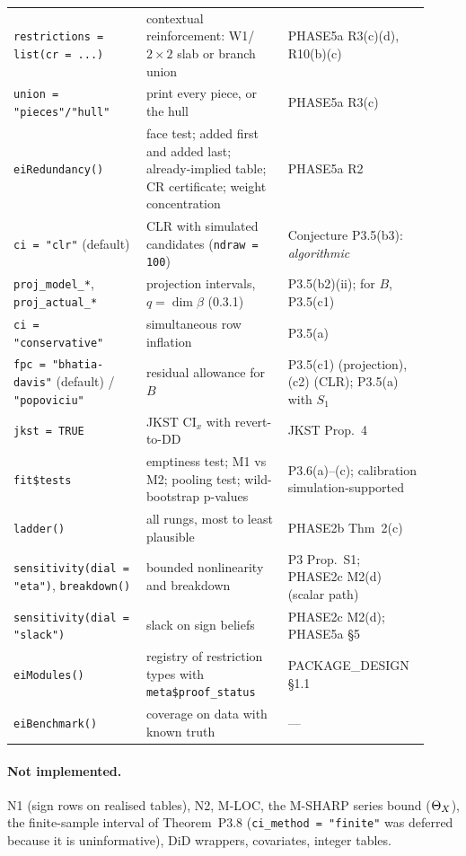 \begin{longtable}{@{}L{0.30\linewidth}L{0.32\linewidth}L{0.30\linewidth}@{}}
\texttt{restrictions = list(cr = ...)} & contextual reinforcement: W1/$2\times2$ slab or branch union & PHASE5a R3(c)(d), R10(b)(c) \\
\texttt{union = "pieces"/"hull"} & print every piece, or the hull & PHASE5a R3(c) \\
\texttt{eiRedundancy()} & face test; added first and added last; already-implied table; CR certificate; weight concentration & PHASE5a R2 \\
\texttt{ci = "clr"} (default) & CLR with simulated candidates (\texttt{ndraw = 100}) & Conjecture P3.5(b3): \emph{algorithmic} \\
\texttt{proj\_model\_*}, \texttt{proj\_actual\_*} & projection intervals, $q=\dim\beta$ (0.3.1) & P3.5(b2)(ii); for $B$, P3.5(c1) \\
\texttt{ci = "conservative"} & simultaneous row inflation & P3.5(a) \\
\texttt{fpc = "bhatia-davis"} (default) / \texttt{"popoviciu"} & residual allowance for $B$ & P3.5(c1) (projection), (c2) (CLR); P3.5(a) with $S_1$ \\
\texttt{jkst = TRUE} & JKST $\mathrm{CI}_x$ with revert-to-DD & JKST Prop.~4 \\
\texttt{fit\$tests} & emptiness test; M1 vs M2; pooling test; wild-bootstrap p-values & P3.6(a)--(c); calibration simulation-supported \\
\texttt{ladder()} & all rungs, most to least plausible & PHASE2b Thm~2(c) \\
\texttt{sensitivity(dial = "eta")}, \texttt{breakdown()} & bounded nonlinearity and breakdown & P3 Prop.~S1; PHASE2c M2(d) (scalar path) \\
\texttt{sensitivity(dial = "slack")} & slack on sign beliefs & PHASE2c M2(d); PHASE5a \S5 \\
\texttt{eiModules()} & registry of restriction types with \texttt{meta\$proof\_status} & PACKAGE\_DESIGN \S1.1 \\
\texttt{eiBenchmark()} & coverage on data with known truth & --- \\
\bottomrule
\end{longtable}

\paragraph{Not implemented.} N1 (sign rows on realised tables), N2, M-LOC, the
M-SHARP series bound ($\Theta_X$), the finite-sample interval of Theorem~P3.8
(\texttt{ci\_method = "finite"} was deferred because it is uninformative), DiD
wrappers, covariates, integer tables.

